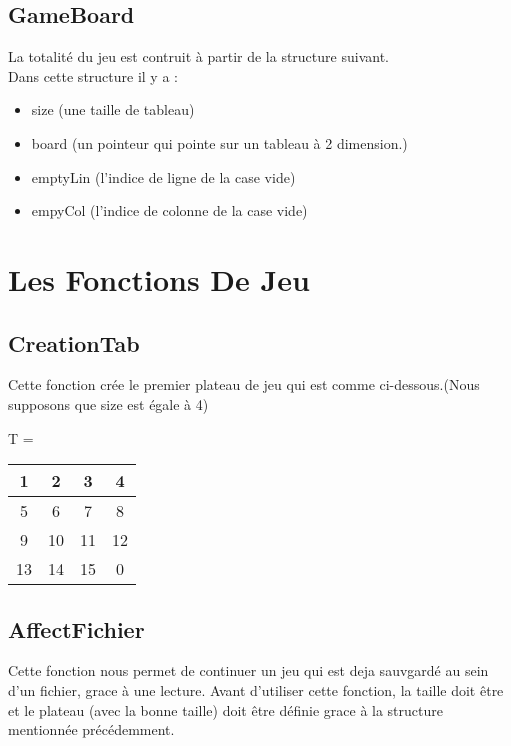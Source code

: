 \documentclass{article}
\begin{document}
\subsection{GameBoard}
La totalité du jeu est contruit à partir de la structure suivant.
\\
Dans cette structure il y a : \\

\begin{itemize}
	\item size (une taille de tableau)
	\item board (un pointeur qui pointe sur un tableau à 2 dimension.)
	\item emptyLin (l'indice de ligne de la case vide)
	\item empyCol (l'indice de colonne de la case vide)
\end{itemize}

\newpage

\section{Les Fonctions De Jeu}

\subsection{CreationTab}
Cette fonction crée le premier plateau de jeu qui est comme ci-dessous.(Nous supposons que size est égale à 4) \\

\begin{center}
	T =
	\begin{tabular}{|c|c|c|c|} \hline
	 1 & 2 & 3 & 4 \\  \hline
	 5 & 6 & 7 & 8 \\  \hline
	 9 & 10 & 11 & 12 \\ \hline
	13 & 14 & 15 & 0 \\ \hline
	\end{tabular}
\end{center}
 

\subsection{AffectFichier}
Cette fonction nous permet de continuer un jeu qui est deja sauvgardé au sein d'un fichier, grace à une lecture. Avant d'utiliser cette fonction, la taille doit être et le plateau (avec la bonne taille) doit être définie grace à la structure mentionnée précédemment.
\end{document}
